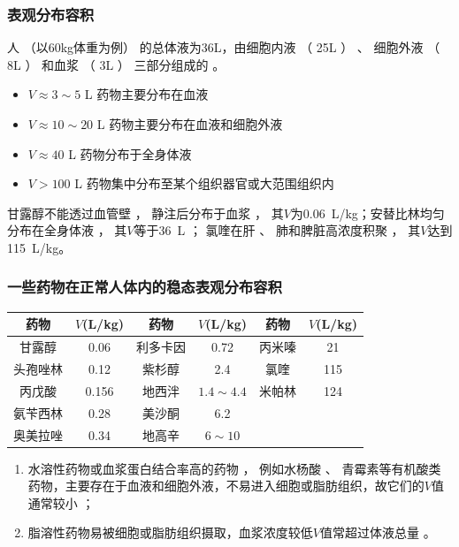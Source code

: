 \documentclass[dvipsnames, svgnames, x11names]{beamer}
\begin{document}
\begin{frame}
    \frametitle{表观分布容积}
    人 （以60kg体重为例） 的总体液为36L，由细胞内液 （ 25L ） 、 细胞外液 （ 8L ） 和血浆 （ 3L ） 三部分组成的 。

    \begin{itemize}
      \item $V\approx 3 \sim 5$ L 药物主要分布在血液
      \item $V\approx 10 \sim 20$ L 药物主要分布在血液和细胞外液
      \item $V\approx 40$ L 药物分布于全身体液
      \item $V>100$ L 药物集中分布至某个组织器官或大范围组织内
    \end{itemize}
    \begin{blankblock}{}
        甘露醇不能透过血管壁 ， 静注后分布于血浆 ， 其$V$为\SI{0.06}{L/kg}；安替比林均匀分布在全身体液 ， 其$V$等于\SI{36}{L} ； 氯喹在肝 、 肺和脾脏高浓度积聚 ， 其$V$达到\SI{115}{L/kg}。
    \end{blankblock}
\end{frame}


\begin{frame}
    \frametitle{一些药物在正常人体内的稳态表观分布容积}
    \begin{table}
        \centering
        \begin{tabular}{cc|cc|cc}
            \bottomrule
            药物 & $V$(\si{L/kg}) & 药物 & $V$(\si{L/kg}) & 药物 & $V$(\si{L/kg}) \\ \hline
            甘露醇 & 0.06 & 利多卡因 & 0.72 & 丙米嗪 & 21  \\
            头孢唑林 & 0.12 & 紫杉醇 & 2.4 & 氯喹 & 115 \\
            丙戊酸 & 0.156 & 地西泮 & $1.4\sim 4.4$ & 米帕林 & 124 \\
            氨苄西林 & 0.28 & 美沙酮 & 6.2  \\
            奥美拉唑 & 0.34 & 地高辛 & $6\sim 10$  \\ \toprule
        \end{tabular}
    \end{table}
    \begin{enumerate}
      \item 水溶性药物或血浆蛋白结合率高的药物 ， 例如水杨酸 、 青霉素等有机酸类药物，主要存在于血液和细胞外液，不易进入细胞或脂肪组织，故它们的$V$值通常较小 ；
      \item 脂溶性药物易被细胞或脂肪组织摄取，血浆浓度较低$V$值常超过体液总量 。
    \end{enumerate}
\end{frame}
\end{document}
